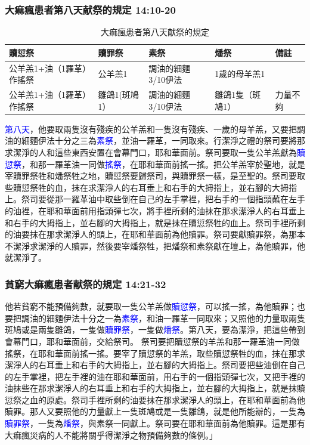 \subsubsection{大痲瘋患者第八天献祭的規定 14:10-20}
\begin{table}[!hbp] 
\centering
\begin{tabular}{ l|l|l|l|l }
\hline
\hline
  贖愆祭                          &贖罪祭   &素祭                       &燔祭 &備註 \\ \hline
公羊羔1+油（1羅革）作搖祭&公羊羔1       &調油的細麵3/10伊法&1歲的母羊羔1 & \\ \hline
公羊羔1+油（1羅革）作搖祭&雛鴿1(斑鳩1）&調油的細麵3/10伊法&雛鴿1隻（斑鳩1）&力量不夠 \\\hline
\end{tabular}
\caption{大痲瘋患者第八天献祭的規定}
\end{table}
\textcolor{blue}{第八天}，他要取兩隻沒有殘疾的公羊羔和一隻沒有殘疾、一歲的母羊羔，又要把調油的細麵伊法十分之三為\textcolor{blue}{素祭}，並油一羅革，一同取來。行潔淨之禮的祭司要將那求潔淨的人和這些東西安置在會幕門口，耶和華面前。祭司要取一隻公羊羔獻為\textcolor{blue}{贖愆祭}，和那一羅革油一同做\textcolor{blue}{搖祭}，在耶和華面前搖一搖。把公羊羔宰於聖地，就是宰贖罪祭牲和燔祭牲之地，贖愆祭要歸祭司，與贖罪祭一樣，是至聖的。祭司要取些贖愆祭牲的血，抹在求潔淨人的右耳垂上和右手的大拇指上，並右腳的大拇指上。祭司要從那一羅革油中取些倒在自己的左手掌裡，把右手的一個指頭蘸在左手的油裡，在耶和華面前用指頭彈七次，將手裡所剩的油抹在那求潔淨人的右耳垂上和右手的大拇指上，並右腳的大拇指上，就是抹在贖愆祭牲的血上。祭司手裡所剩的油要抹在那求潔淨人的頭上，在耶和華面前為他贖罪。祭司要獻贖罪祭，為那本不潔淨求潔淨的人贖罪，然後要宰燔祭牲，把燔祭和素祭獻在壇上，為他贖罪，他就潔淨了。

\subsubsection{貧窮大痲瘋患者献祭的規定 14:21-32}
他若貧窮不能預備夠數，就要取一隻公羊羔做\textcolor{blue}{贖愆祭}，可以搖一搖，為他贖罪；也要把調油的細麵伊法十分之一為\textcolor{blue}{素祭}，和油一羅革一同取來；又照他的力量取兩隻斑鳩或是兩隻雛鴿，一隻做\textcolor{blue}{贖罪祭}，一隻做\textcolor{blue}{燔祭}。第八天，要為潔淨，把這些帶到會幕門口，耶和華面前，交給祭司。 祭司要把贖愆祭的羊羔和那一羅革油一同做搖祭，在耶和華面前搖一搖。要宰了贖愆祭的羊羔，取些贖愆祭牲的血，抹在那求潔淨人的右耳垂上和右手的大拇指上，並右腳的大拇指上。祭司要把些油倒在自己的左手掌裡，把左手裡的油在耶和華面前，用右手的一個指頭彈七次，又把手裡的油抹些在那求潔淨人的右耳垂上和右手的大拇指上，並右腳的大拇指上，就是抹贖愆祭之血的原處。祭司手裡所剩的油要抹在那求潔淨人的頭上，在耶和華面前為他贖罪。那人又要照他的力量獻上一隻斑鳩或是一隻雛鴿，就是他所能辦的，一隻為\textcolor{blue}{贖罪祭}，一隻為\textcolor{blue}{燔祭}，與素祭一同獻上。祭司要在耶和華面前為他贖罪。這是那有大痲瘋災病的人不能將關乎得潔淨之物預備夠數的條例。」


